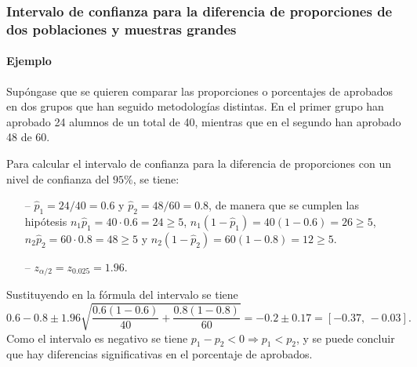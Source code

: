 \begin{frame}
\frametitle{Intervalo de confianza para la diferencia de proporciones de dos poblaciones y muestras grandes}
\framesubtitle{Ejemplo}
Supóngase que se quieren comparar las proporciones o porcentajes de aprobados en dos grupos que han seguido metodologías distintas. 
En el primer grupo han aprobado 24 alumnos de un total de 40, mientras que en el segundo han aprobado 48 de 60. 

Para calcular el intervalo de confianza para la diferencia de proporciones con un nivel de confianza del $95\%$, se tiene:
\begin{itemize}
\item[--] $\hat{p}_1=24/40= 0.6$ y $\hat{p}_2=48/60=0.8$, de manera que se cumplen las hipótesis $n_1\hat{p}_1=40\cdot 0.6=24\geq 5$, $n_1(1-\hat{p}_1)=40(1-0.6)=26\geq 5$, $n_2\hat{p}_2=60\cdot 0.8 =48\geq 5$ y $n_2(1-\hat{p}_2)=60(1-0.8)=12\geq 5$.
\item[--] $z_{\alpha/2}=z_{0.025}= 1.96$.
\end{itemize} 
Sustituyendo en la fórmula del intervalo se tiene
\[
0.6-0.8\pm 1.96 \sqrt{\frac{0.6(1-0.6)}{40}+\frac{0.8(1-0.8)}{60}} = -0.2\pm 0.17 = [-0.37,\, -0.03].
\]
Como el intervalo es negativo se tiene $p_1-p_2<0\Rightarrow p_1<p_2$, y se puede concluir que hay diferencias significativas en el porcentaje de aprobados.
\end{frame}
